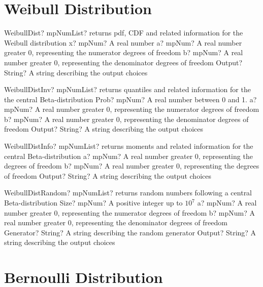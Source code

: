 \documentclass[12pt,a4paper,openany]{book}
\begin{document}
\section{Weibull Distribution}

\begin{mpFunctionsExtract}
\mpFunctionFour
{WeibullDist? mpNumList? returns pdf, CDF and related information for the Weibull distribution}
{x? mpNum? A real number}
{a? mpNum? A real number greater 0, representing the numerator  degrees of freedom}
{b? mpNum? A real number greater 0, representing the denominator degrees of freedom}
{Output? String? A string describing the output choices}
\end{mpFunctionsExtract}

\begin{mpFunctionsExtract}
\mpFunctionFour
{WeibullDistInv? mpNumList? returns quantiles and related information for the the central Beta-distribution}
{Prob? mpNum? A real number between 0 and 1.}
{a? mpNum? A real number greater 0, representing the numerator  degrees of freedom}
{b? mpNum? A real number greater 0, representing the denominator degrees of freedom}
{Output? String? A string describing the output choices}
\end{mpFunctionsExtract}

\begin{mpFunctionsExtract}
\mpFunctionThree
{WeibullDistInfo? mpNumList? returns moments and related information for the central Beta-distribution}
{a? mpNum? A real number greater 0, representing the degrees of freedom}
{b? mpNum? A real number greater 0, representing the degrees of freedom}
{Output? String? A string describing the output choices}
\end{mpFunctionsExtract}

\begin{mpFunctionsExtract}
\mpFunctionFive
{WeibullDistRandom? mpNumList? returns random numbers following a central Beta-distribution}
{Size? mpNum? A positive integer up to $10^7$}
{a? mpNum? A real number greater 0, representing the numerator  degrees of freedom}
{b? mpNum? A real number greater 0, representing the denominator degrees of freedom}
{Generator? String? A string describing the random generator}
{Output? String? A string describing the output choices}
\end{mpFunctionsExtract}

\section{Bernoulli Distribution}
\end{document}
